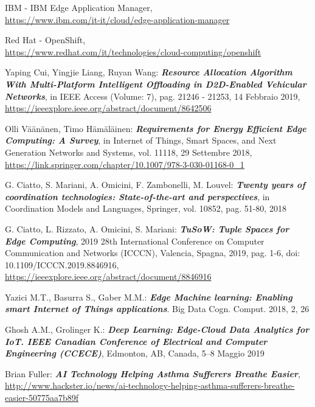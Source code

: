 \documentclass[a4paper,12pt,oneside]{book}
\begin{document}
\begin{thebibliography}{26}
\begin{spacing}{1.25}
	IBM - IBM Edge Application Manager,
	\\\url{https://www.ibm.com/it-it/cloud/edge-application-manager}
	
	Red Hat - OpenShift,
	\\\url{https://www.redhat.com/it/technologies/cloud-computing/openshift}
	
	Yaping Cui, Yingjie Liang, Ruyan Wang: \textbf{\textit{Resource Allocation Algorithm With Multi-Platform Intelligent Offloading in D2D-Enabled Vehicular Networks}}, in IEEE Access (Volume: 7), pag. 21246 - 21253, 14 Febbraio 2019,
	\\\url{https://ieeexplore.ieee.org/abstract/document/8642506}
	
	Olli Väänänen, Timo Hämäläinen: \textbf{\textit{Requirements for Energy Efficient Edge Computing: A Survey}}, in Internet of Things, Smart Spaces, and Next Generation Networks and Systems, vol. 11118,  29 Settembre 2018,
	\\\url{https://link.springer.com/chapter/10.1007/978-3-030-01168-0_1}
	
	G. Ciatto, S. Mariani, A. Omicini, F. Zambonelli, M. Louvel: \textbf{\textit{Twenty years of coordination technologies: State-of-the-art and perspectives}}, in Coordination Models and Languages, Springer, vol. 10852, pag. 51-80, 2018
	
	G. Ciatto, L. Rizzato, A. Omicini, S. Mariani: \textbf{\textit{TuSoW: Tuple Spaces for Edge Computing}}, 2019 28th International Conference on Computer Communication and Networks (ICCCN), Valencia, Spagna, 2019, pag. 1-6, doi: 10.1109/ICCCN.2019.8846916,
	\\\url{https://ieeexplore.ieee.org/abstract/document/8846916}
	
	Yazici M.T., Basurra S., Gaber M.M.:  \textbf{\textit{Edge Machine learning: Enabling smart Internet of Things applications}}. Big Data Cogn. Comput. 2018, 2, 26
	
	Ghosh A.M., Grolinger K.: \textbf{\textit{Deep Learning: Edge-Cloud Data Analytics for IoT. IEEE Canadian Conference of Electrical and Computer Engineering (CCECE)}}, Edmonton, AB, Canada, 5–8 Maggio 2019
	
	Brian Fuller: \textbf{\textit{AI Technology Helping Asthma Sufferers Breathe Easier}},
	\\\url{http://www.hackster.io/news/ai-technology-helping-asthma-sufferers-breathe-easier-50775aa7b89f}
	

\end{spacing}
\end{thebibliography}
\end{document}
